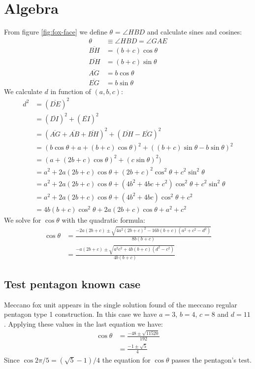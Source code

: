 \documentclass[11pt]{article}
\begin{document}
\section{Algebra}
From figure \ref{fig:fox-face} we define $\theta$ = $\angle{HBD}$ and calculate sines and cosines:
\begin{align}
\theta &\equiv \angle{HBD} = \angle{GAE}\\
\overline{BH} &= (b+c)\cos{\theta}\\
\overline{DH} &= (b+c)\sin{\theta}\\
\overline{AG} &= b\cos{\theta}\\
\overline{EG} &= b\sin{\theta}
\end{align}
We calculate $d$ in function of $(a,b,c)$:
\begin{align}
d^2 &= (\overline{DE})^2 \nonumber\\
 &= (\overline{DI})^2 + (\overline{EI})^2 \nonumber\\
 &= (\overline{AG} + \overline{AB} + \overline{BH})^2 + (\overline{DH} - \overline{EG})^2\\
 &= (b\cos{\theta} + a + (b+c)\cos{\theta})^2 + ((b+c)\sin{\theta} - b\sin{\theta})^2\\
 &= (a + (2b+c)\cos{\theta})^2 + (c\sin{\theta})^2)\nonumber\\
 &= a^2 + 2a(2b+c)\cos{\theta} + (2b+c)^2\cos^2{\theta} + c^2\sin^2{\theta}\nonumber\\
 &= a^2 + 2a(2b+c)\cos{\theta} + (4b^2 + 4bc + c^2)\cos^2{\theta} + c^2\sin^2{\theta}\nonumber\\
 &= a^2 + 2a(2b+c)\cos{\theta} + (4b^2 + 4bc)\cos^2{\theta} + c^2\nonumber\\
 &= 4b(b + c)\cos^2{\theta} + 2a(2b+c)\cos{\theta} + a^2 + c^2
\end{align}
We solve for $\cos{\theta}$ with the quadratic formula:
\begin{align}
\cos{\theta} &= \frac{-2a(2b+c) \pm \sqrt{4a^2(2b+c)^2 - 16b(b+c)(a^2 + c^2 - d^2)}}{8b(b+c)} \nonumber\\
 &= \frac{-a(2b+c) \pm \sqrt{a^2c^2 + 4b(b+c)(d^2-c^2)}}{4b(b+c)}
\end{align}

\subsection{Test pentagon known case}
Meccano fox unit appears in the single solution found of the meccano regular pentagon type 1 construction.
In this case we have $a=3$, $b=4$, $c=8$ and $d=11$. Applying these values in the last equation we have:
\begin{align}
\cos{\theta} &= \frac{-48 \pm \sqrt{11520}}{192} \nonumber\\
 &= \frac{-1 \pm \sqrt{5}}{4}
\end{align}
Since $\cos{2\pi/5} = (\sqrt{5} - 1)/4$ the equation for $\cos{\theta}$ passes the pentagon's test.
\end{document}
